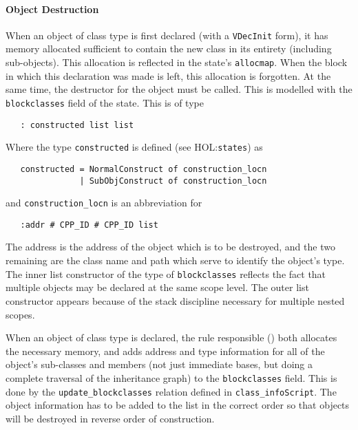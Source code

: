 \documentclass[11pt]{article}
\newcommand{\HOLfile}[1]{HOL:\texttt{#1}}
\begin{document}
\paragraph{Object Destruction}
When an object of class type is first declared (with a
\texttt{VDecInit} form), it has memory allocated sufficient to contain
the new class in its entirety (including sub-objects).  This
allocation is reflected in the state's \texttt{allocmap}.  When the
block in which this declaration was made is left, this allocation is
forgotten.  At the same time, the destructor for the object must be
called.  This is modelled with the
\texttt{blockclasses} field of the state.%
%
This is of type
\begin{verbatim}
   : constructed list list
\end{verbatim}
Where the type \texttt{constructed} is defined (see \HOLfile{states})
as
\begin{verbatim}
   constructed = NormalConstruct of construction_locn
               | SubObjConstruct of construction_locn
\end{verbatim}
and \texttt{construction_locn} is an abbreviation for
\begin{verbatim}
   :addr # CPP_ID # CPP_ID list
\end{verbatim}
The address is the address of the object which is to be destroyed, and
the two remaining are the class name and path which serve to identify
the object's type.  The inner list constructor of the type of
\texttt{blockclasses} reflects the fact that multiple objects may be
declared at the same scope level.  The outer list constructor appears
because of the stack discipline necessary for multiple nested scopes.

When an object of class type is declared, the rule responsible
() both allocates
the necessary memory, and adds address and type information for all of
the object's sub-classes and members (not just immediate bases, but
doing a complete traversal of the inheritance graph) to the
\texttt{blockclasses} field.  This is done by the
\texttt{update_blockclasses} relation defined in
\texttt{class_infoScript}.  The object information has to be added
to the list in the correct order so that objects will be destroyed in
reverse order of construction.
\end{document}
